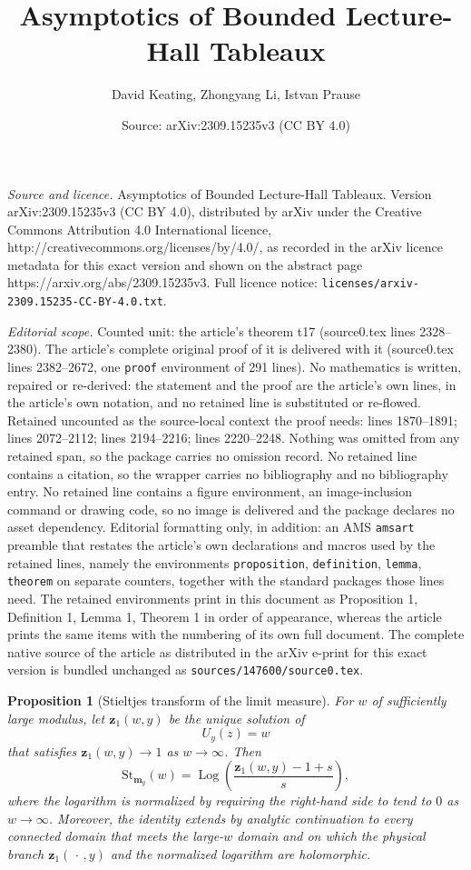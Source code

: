 \documentclass[10pt,a4paper]{amsart}
\title{Asymptotics of Bounded Lecture-Hall Tableaux}
\author{David Keating, Zhongyang Li, Istvan Prause}
\date{Source: arXiv:2309.15235v3 (CC BY 4.0)}
\newtheorem{proposition}{Proposition}
\begin{document}
\maketitle

\noindent\emph{Source and licence.} Asymptotics of Bounded Lecture-Hall Tableaux. Version arXiv:2309.15235v3 (CC BY 4.0), distributed by arXiv under the Creative Commons Attribution 4.0 International licence, http://creativecommons.org/licenses/by/4.0/, as recorded in the arXiv licence metadata for this exact version and shown on the abstract page https://arxiv.org/abs/2309.15235v3. Full licence notice: \texttt{licenses/arxiv-2309.15235-CC-BY-4.0.txt}.\par\smallskip

\noindent\textit{Editorial scope.} Counted unit: the article's theorem t17 (source0.tex lines 2328--2380). The article's complete original proof of it is delivered with it (source0.tex lines 2382--2672, one \texttt{proof} environment of 291 lines). No mathematics is written, repaired or re-derived: the statement and the proof are the article's own lines, in the article's own notation, and no retained line is substituted or re-flowed.  Retained uncounted as the source-local context the proof needs: lines 1870--1891; lines 2072--2112; lines 2194--2216; lines 2220--2248.  Nothing was omitted from any retained span, so the package carries no omission record.  No retained line contains a citation, so the wrapper carries no bibliography and no bibliography entry.  No retained line contains a figure environment, an image-inclusion command or drawing code, so no image is delivered and the package declares no asset dependency.  Editorial formatting only, in addition: an AMS \texttt{amsart} preamble that restates the article's own declarations and macros used by the retained lines, namely the environments \texttt{proposition}, \texttt{definition}, \texttt{lemma}, \texttt{theorem} on separate counters, together with the standard packages those lines need.  The retained environments print in this document as Proposition 1, Definition 1, Lemma 1, Theorem 1 in order of appearance, whereas the article prints the same items with the numbering of its own full document.  The complete native source of the article as distributed in the arXiv e-print for this exact version is bundled unchanged as \texttt{sources/147600/source0.tex}.
\begin{proposition}[Stieltjes transform of the limit measure]
\label{prop:stieltjes-root}
For $w$ of sufficiently large modulus, let $\mathbf z_1(w,y)$ be the unique
solution of
 \[
U_y(z)=w
\]
that    satisfies $\mathbf z_1(w,y)\to1$ as $w\to\infty$. Then
\begin{equation}
\mathrm{St}_{\mathbf m_y}(w)
=
\operatorname{Log}\!\left(
\frac{\mathbf z_1(w,y)-1+s}{s}
\right),
\label{eq:st-root-large-w}
\end{equation}
where the logarithm is normalized by requiring the right-hand side to tend to
$0$ as $w\to\infty$.  Moreover, the identity extends by analytic
continuation to every connected domain that meets the large-$w$ domain and on
which the physical branch $\mathbf z_1(\,\cdot\,,y)$ and the normalized
logarithm are holomorphic.
\end{proposition}
\end{document}
